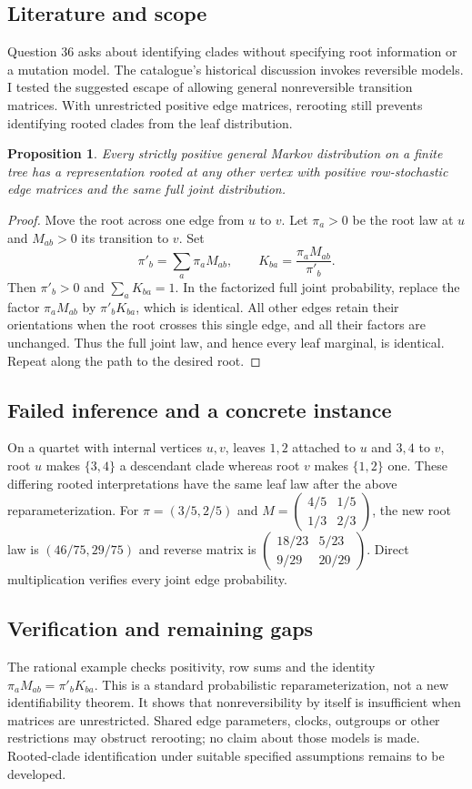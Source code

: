 \documentclass[11pt]{article}
\newtheorem{proposition}{Proposition}
\begin{document}
\subsection{Literature and scope}
Question 36 asks about identifying clades without specifying root information or a mutation model. The catalogue's historical discussion invokes reversible models. I tested the suggested escape of allowing general nonreversible transition matrices. With unrestricted positive edge matrices, rerooting still prevents identifying rooted clades from the leaf distribution.
\begin{proposition}
Every strictly positive general Markov distribution on a finite tree has a representation rooted at any other vertex with positive row-stochastic edge matrices and the same full joint distribution.
\end{proposition}
\begin{proof}
Move the root across one edge from $u$ to $v$. Let $\pi_a>0$ be the root law at $u$ and $M_{ab}>0$ its transition to $v$. Set
\[
\pi'_b=\sum_a\pi_aM_{ab},\qquad K_{ba}=\frac{\pi_aM_{ab}}{\pi'_b}.
\]
Then $\pi'_b>0$ and $\sum_aK_{ba}=1$. In the factorized full joint probability, replace the factor $\pi_aM_{ab}$ by $\pi'_bK_{ba}$, which is identical. All other edges retain their orientations when the root crosses this single edge, and all their factors are unchanged. Thus the full joint law, and hence every leaf marginal, is identical. Repeat along the path to the desired root.
\end{proof}
\subsection{Failed inference and a concrete instance}
On a quartet with internal vertices $u,v$, leaves $1,2$ attached to $u$ and $3,4$ to $v$, root $u$ makes $\{3,4\}$ a descendant clade whereas root $v$ makes $\{1,2\}$ one. These differing rooted interpretations have the same leaf law after the above reparameterization. For $\pi=(3/5,2/5)$ and $M=\left(\begin{smallmatrix}4/5&1/5\\1/3&2/3\end{smallmatrix}\right)$, the new root law is $(46/75,29/75)$ and reverse matrix is $\left(\begin{smallmatrix}18/23&5/23\\9/29&20/29\end{smallmatrix}\right)$. Direct multiplication verifies every joint edge probability.
\subsection{Verification and remaining gaps}
The rational example checks positivity, row sums and the identity $\pi_aM_{ab}=\pi'_bK_{ba}$. This is a standard probabilistic reparameterization, not a new identifiability theorem. It shows that nonreversibility by itself is insufficient when matrices are unrestricted. Shared edge parameters, clocks, outgroups or other restrictions may obstruct rerooting; no claim about those models is made. Rooted-clade identification under suitable specified assumptions remains to be developed.
\end{document}
